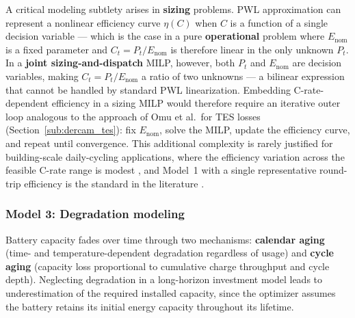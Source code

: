 \documentclass[11pt,a4paper]{report}
\begin{document}
A critical modeling subtlety arises in \textbf{sizing} problems.
PWL approximation can represent a nonlinear efficiency curve $\eta(C)$ when $C$ is a function of a single decision variable --- which is the case in a pure \textbf{operational} problem where $E_{\text{nom}}$ is a fixed parameter and $C_t = P_t / E_{\text{nom}}$ is therefore linear in the only unknown $P_t$.
In a \textbf{joint sizing-and-dispatch} MILP, however, both $P_t$ and $E_{\text{nom}}$ are decision variables, making $C_t = P_t / E_{\text{nom}}$ a ratio of two unknowns --- a bilinear expression that cannot be handled by standard PWL linearization.
Embedding C-rate-dependent efficiency in a sizing MILP would therefore require an iterative outer loop analogous to the approach of Omu et al.\ for TES losses (Section~\ref{sub:dercam_tes}): fix $E_{\text{nom}}$, solve the MILP, update the efficiency curve, and repeat until convergence.
This additional complexity is rarely justified for building-scale daily-cycling applications, where the efficiency variation across the feasible C-rate range is modest \cite{Bobanac2021}, and Model~1 with a single representative round-trip efficiency is the standard in the literature \cite{Gabrielli2018Electrochemical, cardoso2014milp}.

\subsubsection{Model 3: Degradation modeling}
\label{subsub:bess_aging}

Battery capacity fades over time through two mechanisms: \textbf{calendar aging} (time- and temperature-dependent degradation regardless of usage) and \textbf{cycle aging} (capacity loss proportional to cumulative charge throughput and cycle depth).
Neglecting degradation in a long-horizon investment model leads to underestimation of the required installed capacity, since the optimizer assumes the battery retains its initial energy capacity throughout its lifetime.
\end{document}

